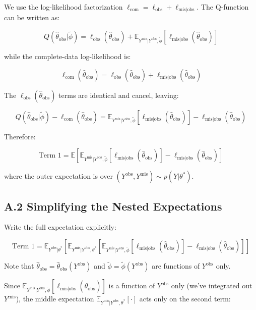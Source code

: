 \documentclass[
]{article}
\begin{document}
We use the log-likelihood factorization
\(\ell_{\text{com}} = \ell_{\text{obs}} + \ell_{\text{mis}|\text{obs}}\).
The Q-function can be written as:

\[Q(\hat{\theta}_{\text{obs}}|\tilde{\phi}) = \ell_{\text{obs}}(\hat{\theta}_{\text{obs}}) + \mathbb{E}_{Y^{\text{mis}}|Y^{\text{obs}},\tilde{\phi}}[\ell_{\text{mis}|\text{obs}}(\hat{\theta}_{\text{obs}})]\]

while the complete-data log-likelihood is:

\[\ell_{\text{com}}(\hat{\theta}_{\text{obs}}) = \ell_{\text{obs}}(\hat{\theta}_{\text{obs}}) + \ell_{\text{mis}|\text{obs}}(\hat{\theta}_{\text{obs}})\]

The \(\ell_{\text{obs}}(\hat{\theta}_{\text{obs}})\) terms are identical
and cancel, leaving:

\[Q(\hat{\theta}_{\text{obs}}|\tilde{\phi}) - \ell_{\text{com}}(\hat{\theta}_{\text{obs}}) = \mathbb{E}_{Y^{\text{mis}}|Y^{\text{obs}},\tilde{\phi}}[\ell_{\text{mis}|\text{obs}}(\hat{\theta}_{\text{obs}})] - \ell_{\text{mis}|\text{obs}}(\hat{\theta}_{\text{obs}})\]

Therefore:

\[\text{Term 1} = \mathbb{E}\left[\mathbb{E}_{Y^{\text{mis}}|Y^{\text{obs}},\tilde{\phi}}[\ell_{\text{mis}|\text{obs}}(\hat{\theta}_{\text{obs}})] - \ell_{\text{mis}|\text{obs}}(\hat{\theta}_{\text{obs}})\right]\]

where the outer expectation is over
\((Y^{\text{obs}}, Y^{\text{mis}}) \sim p(Y|\theta^*)\).

\subsection{A.2 Simplifying the Nested
Expectations}\label{a.2-simplifying-the-nested-expectations}

Write the full expectation explicitly:

\[\text{Term 1} = \mathbb{E}_{Y^{\text{obs}}|\theta^*}\left[\mathbb{E}_{Y^{\text{mis}}|Y^{\text{obs}},\theta^*}\left[\mathbb{E}_{Y^{\text{mis}}|Y^{\text{obs}},\tilde{\phi}}[\ell_{\text{mis}|\text{obs}}(\hat{\theta}_{\text{obs}})] - \ell_{\text{mis}|\text{obs}}(\hat{\theta}_{\text{obs}})\right]\right]\]

Note that
\(\hat{\theta}_{\text{obs}} = \hat{\theta}_{\text{obs}}(Y^{\text{obs}})\)
and \(\tilde{\phi} = \tilde{\phi}(Y^{\text{obs}})\) are functions of
\(Y^{\text{obs}}\) only.

Since
\(\mathbb{E}_{Y^{\text{mis}}|Y^{\text{obs}},\tilde{\phi}}[\ell_{\text{mis}|\text{obs}}(\hat{\theta}_{\text{obs}})]\)
is a function of \(Y^{\text{obs}}\) only (we've integrated out
\(Y^{\text{mis}}\)), the middle expectation
\(\mathbb{E}_{Y^{\text{mis}}|Y^{\text{obs}},\theta^*}[\cdot]\) acts only
on the second term:
\end{document}
